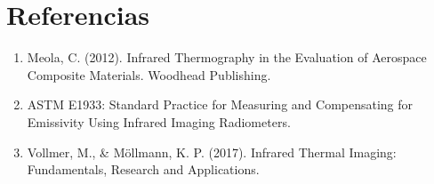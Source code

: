 \documentclass[11pt, a4paper]{article}
\begin{document}
\section{Referencias}
\begin{enumerate}
    \item Meola, C. (2012). Infrared Thermography in the Evaluation of Aerospace Composite Materials. Woodhead Publishing.
    \item ASTM E1933: Standard Practice for Measuring and Compensating for Emissivity Using Infrared Imaging Radiometers.
    \item Vollmer, M., \& Möllmann, K. P. (2017). Infrared Thermal Imaging: Fundamentals, Research and Applications.
\end{enumerate}
\end{document}
